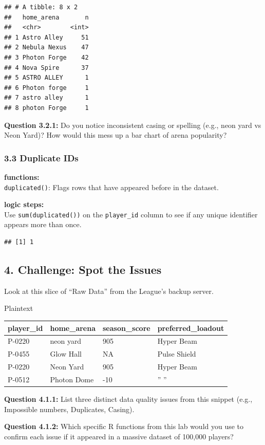 \documentclass[
]{article}
\newenvironment{Shaded}{\begin{snugshade}}{\end{snugshade}}
\newcommand{\FunctionTok}[1]{\textcolor[rgb]{0.13,0.29,0.53}{\textbf{#1}}}
\newcommand{\NormalTok}[1]{#1}
\newcommand{\SpecialCharTok}[1]{\textcolor[rgb]{0.81,0.36,0.00}{\textbf{#1}}}
\begin{document}
\begin{verbatim}
## # A tibble: 8 x 2
##   home_arena       n
##   <chr>        <int>
## 1 Astro Alley     51
## 2 Nebula Nexus    47
## 3 Photon Forge    42
## 4 Nova Spire      37
## 5 ASTRO ALLEY      1
## 6 Photon forge     1
## 7 astro alley      1
## 8 photon Forge     1
\end{verbatim}

\textbf{Question 3.2.1:} Do you notice inconsistent casing or spelling
(e.g., neon yard vs Neon Yard)? How would this mess up a bar chart of
arena popularity?

\subsubsection{3.3 Duplicate IDs}\label{duplicate-ids}

\textbf{functions:}\\
\texttt{duplicated()}: Flags rows that have appeared before in the
dataset.

\textbf{logic steps:}\\
Use \texttt{sum(duplicated())} on the \texttt{player\_id} column to see
if any unique identifier appears more than once.

\begin{Shaded}
\end{Shaded}

\begin{verbatim}
## [1] 1
\end{verbatim}

\subsection{4. Challenge: Spot the
Issues}\label{challenge-spot-the-issues}

Look at this slice of ``Raw Data'' from the League's backup server.

Plaintext

\begin{longtable}[]{@{}llll@{}}
\toprule\noalign{}
player\_id & home\_arena & season\_score & preferred\_loadout \\
\midrule\noalign{}
\endhead
\bottomrule\noalign{}
\endlastfoot
P-0220 & neon yard & 905 & Hyper Beam \\
P-0455 & Glow Hall & NA & Pulse Shield \\
P-0220 & Neon Yard & 905 & Hyper Beam \\
P-0512 & Photon Dome & -10 & '' '' \\
\end{longtable}

\textbf{Question 4.1.1:} List three distinct data quality issues from
this snippet (e.g., Impossible numbers, Duplicates, Casing).

\textbf{Question 4.1.2:} Which specific R functions from this lab would
you use to confirm each issue if it appeared in a massive dataset of
100,000 players?
\end{document}
